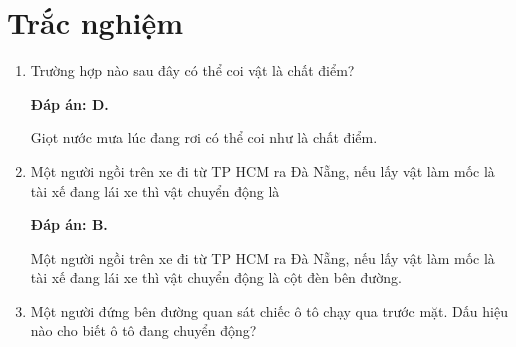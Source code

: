 \whiteBGstarBegin
\setcounter{section}{0}
\section{Trắc nghiệm}
\begin{enumerate}[label=\bfseries Câu \arabic*:]
	\item {}
	
	\cauhoi
	{Trường hợp nào sau đây có thể coi vật là chất điểm?
	}
	
	\loigiai
	{		\textbf{Đáp án: D.}
		
	Giọt nước mưa lúc đang rơi có thể coi như là chất điểm.
		
	}
\item {}

\cauhoi
{Một người ngồi trên xe đi từ TP HCM ra Đà Nẵng, nếu lấy vật làm mốc là tài xế đang lái xe thì vật chuyển động là
}

\loigiai
{		\textbf{Đáp án: B.}
	
	Một người ngồi trên xe đi từ TP HCM ra Đà Nẵng, nếu lấy vật làm mốc là tài xế đang lái xe thì vật chuyển động là cột đèn bên đường.
	
}
	\item {}
	
	\cauhoi
	{Một người đứng bên đường quan sát chiếc ô tô chạy qua trước mặt. Dấu hiệu nào cho biết ô tô đang chuyển động? 
	}
	

\end{enumerate}
